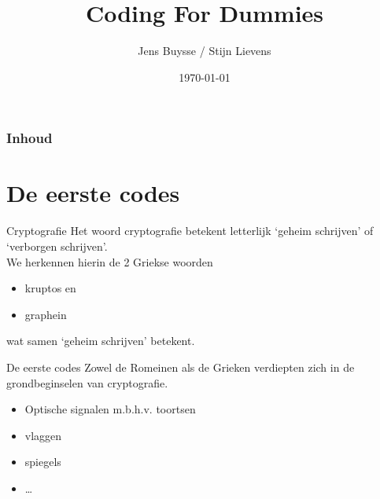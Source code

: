 \documentclass{beamer}
\title[Intro]{Coding For Dummies}
\author{Jens {Buysse} / Stijn Lievens}
\date{\today}
\begin{document}

\HoGentLogo

\titleframe


\begin{frame}
  \frametitle{Inhoud}

  \tableofcontents
\end{frame}


\section{De eerste codes}


\begin{frame}{Cryptografie}
	Het woord \textcolor{HoGentBlue}{cryptografie} betekent letterlijk  \textcolor{HoGentBlue}{‘geheim schrijven’} of  \textcolor{HoGentBlue}{‘verborgen schrijven’}.\\
	We herkennen hierin de 2 Griekse woorden 
	\begin{itemize}
		\item kruptos  en %
		\item graphein
	\end{itemize}
	 wat samen ‘geheim schrijven’ betekent.
\end{frame}

\begin{frame}{De eerste codes}
	Zowel de Romeinen als de Grieken verdiepten zich in de grondbeginselen van cryptografie. 
	
	\begin{itemize}
		\item Optische signalen m.b.h.v. toortsen
		\item vlaggen
		\item spiegels
		\item \dots
	\end{itemize}
\end{frame}
\end{document}
